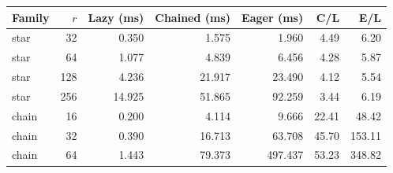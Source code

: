 \begin{tabular}{lrrrrrr}
\toprule
Family & $r$ & Lazy (ms) & Chained (ms) & Eager (ms) & C/L & E/L \\
\midrule
star & 32 & 0.350 & 1.575 & 1.960 & 4.49 & 6.20 \\
star & 64 & 1.077 & 4.839 & 6.456 & 4.28 & 5.87 \\
star & 128 & 4.236 & 21.917 & 23.490 & 4.12 & 5.54 \\
star & 256 & 14.925 & 51.865 & 92.259 & 3.44 & 6.19 \\
chain & 16 & 0.200 & 4.114 & 9.666 & 22.41 & 48.42 \\
chain & 32 & 0.390 & 16.713 & 63.708 & 45.70 & 153.11 \\
chain & 64 & 1.443 & 79.373 & 497.437 & 53.23 & 348.82 \\
\bottomrule
\end{tabular}
